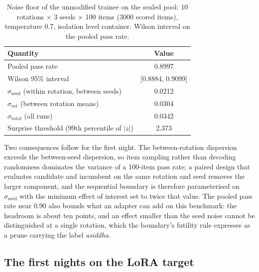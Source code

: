 \begin{table}[t]
\centering
\caption{Noise floor of the unmodified trainee on the sealed pool: 10 rotations $\times$ 3 seeds $\times$ 100 items (3000 scored items), temperature 0.7, isolation level container. Wilson interval on the pooled pass rate.}
\label{tab:l3-noise}
\begin{tabular}{lc}
\toprule
\textbf{Quantity} & \textbf{Value} \\
\midrule
Pooled pass rate & 0.8997 \\
Wilson 95\% interval & [0.8884, 0.9099] \\
$\sigma_{\mathrm{seed}}$ (within rotation, between seeds) & 0.0212 \\
$\sigma_{\mathrm{rot}}$ (between rotation means) & 0.0304 \\
$\sigma_{\mathrm{total}}$ (all runs) & 0.0342 \\
Surprise threshold (99th percentile of $|z|$) & 2.373 \\
\bottomrule
\end{tabular}
\end{table}

Two consequences follow for the first night. The between-rotation dispersion exceeds the between-seed dispersion, so item sampling rather than decoding randomness dominates the variance of a 100-item pass rate; a paired design that evaluates candidate and incumbent on the same rotation and seed removes the larger component, and the sequential boundary is therefore parameterised on $\sigma_{\mathrm{seed}}$ with the minimum effect of interest set to twice that value. The pooled pass rate near 0.90 also bounds what an adapter can add on this benchmark: the headroom is about ten points, and an effect smaller than the seed noise cannot be distinguished at a single rotation, which the boundary's futility rule expresses as a prune carrying the label \emph{asiddha}.

\subsection{The first nights on the LoRA target}
\label{sec:results-l4}

